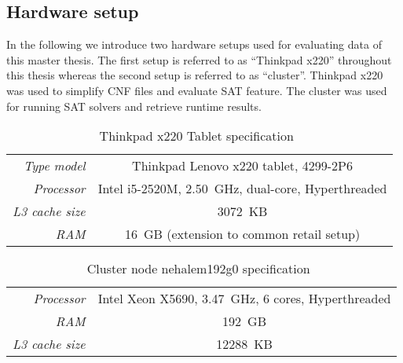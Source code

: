 \begin{appendices}
\chapter{Hardware setup}
\label{app:setup}
%
In the following we introduce two hardware setups used for evaluating
data of this master thesis. The first setup is referred to as
\enquote{Thinkpad x220} throughout this thesis whereas the second
setup is referred to as \enquote{cluster}. Thinkpad x220 was used
to simplify CNF files and evaluate SAT feature. The cluster was used
for running SAT solvers and retrieve runtime results.

%
\begin{table}[!ht]
  \begin{center}
    \begin{tabular}{rc}
      \hline
      \emph{Type model}     & Thinkpad Lenovo x220 tablet, 4299-2P6 \\
      \emph{Processor}      & Intel i5-2520M, 2.50~GHz, dual-core, Hyperthreaded \\
      \emph{L3 cache size}  & 3072~KB \\
      \emph{RAM}            & 16~GB (extension to common retail setup) \\
      \hline
    \end{tabular}
    \caption{Thinkpad x220 Tablet specification~\cite{thinkpadx220}}
    \label{setup:thinkpadx220}
  \end{center}
\end{table}

\begin{table}[!ht]
  \begin{center}
    \begin{tabular}{rc}
      \hline
      \emph{Processor}     & Intel Xeon X5690, 3.47~GHz, 6 cores, Hyperthreaded \\
      \emph{RAM}           & 192~GB \\
      \emph{L3 cache size} & 12288~KB \\
      \hline
    \end{tabular}
    \caption{Cluster node nehalem192g0 specification~\cite{intelX5690}}
    \label{setup:cluster}
  \end{center}
\end{table}


\end{appendices}
